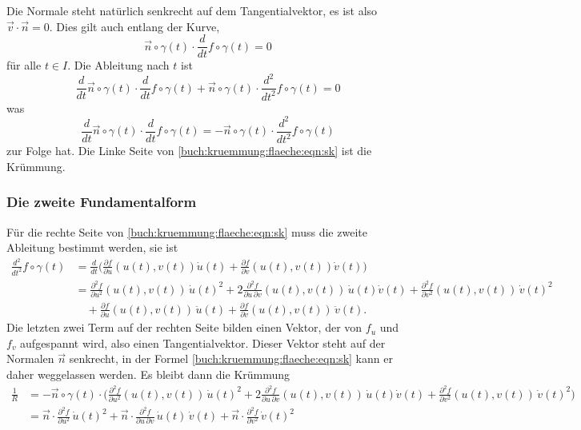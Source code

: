 Die Normale steht natürlich senkrecht auf dem Tangentialvektor, 
es ist also $\vec{v}\cdot\vec{n}=0$.
Dies gilt auch entlang der Kurve, 
\[
\vec{n}\circ\gamma(t) \cdot \frac{d}{dt}f\circ\gamma(t)
=
0
\]
für alle $t\in I$.
Die Ableitung nach $t$ ist
\[
\frac{d}{dt}
\vec{n}\circ\gamma(t)
\cdot
\frac{d}{dt}f\circ\gamma(t)
+
\vec{n}\circ\gamma(t)
\cdot
\frac{d^2}{dt^2}f\circ\gamma(t)
=
0
\]
was
\begin{equation}
\frac{d}{dt}\vec{n}\circ\gamma(t)\cdot \frac{d}{dt}f\circ\gamma(t)
=
-
\vec{n}\circ\gamma(t)
\cdot
\frac{d^2}{dt^2}f\circ\gamma(t)
\label{buch:kruemmung:flaeche:eqn:sk}
\end{equation}
zur Folge hat.
Die Linke Seite von \eqref{buch:kruemmung:flaeche:eqn:sk}
ist die Krümmung.

%
%
\subsubsection{Die zweite Fundamentalform}
Für die rechte Seite von \eqref{buch:kruemmung:flaeche:eqn:sk}
muss die zweite Ableitung bestimmt werden, sie ist
\begin{align*}
\frac{d^2}{dt^2}
f\circ\gamma(t)
&=
\frac{d}{dt}
\biggl(
\frac{\partial f}{\partial u}(u(t),v(t)) \dot{u}(t)
+
\frac{\partial f}{\partial v}(u(t),v(t)) \dot{v}(t)
\biggr)
\\
&=
\frac{\partial^2 f}{\partial u^2}(u(t),v(t)) \, \dot{u}(t)^2
+
2\frac{\partial^2 f}{\partial u\,\partial v}(u(t),v(t)) \, \dot{u}(t) \dot{v}(t)
+
\frac{\partial^2 f}{\partial v^2}(u(t),v(t)) \, \dot{v}(t)^2
\\
&\quad
+
\frac{\partial f}{\partial u}(u(t),v(t)) \, \ddot{u}(t)
+
\frac{\partial f}{\partial v}(u(t),v(t)) \, \ddot{v}(t).
\end{align*}
Die letzten zwei Term auf der rechten Seite bilden einen Vektor, der von $f_u$
und $f_v$ aufgespannt wird, also einen Tangentialvektor.
Dieser Vektor steht auf der Normalen $\vec{n}$ senkrecht, in der
Formel \eqref{buch:kruemmung:flaeche:eqn:sk} kann er daher weggelassen
werden.
Es bleibt dann die Krümmung
\begin{align*}
\frac{1}{R}
&=
-\vec{n}\circ\gamma(t)
\cdot 
\biggl(
\frac{\partial^2 f}{\partial u^2}(u(t),v(t)) \, \dot{u}(t)^2
+
2\frac{\partial^2 f}{\partial u\,\partial v}(u(t),v(t)) \, \dot{u}(t) \dot{v}(t)
+
\frac{\partial^2 f}{\partial v^2}(u(t),v(t)) \, \dot{v}(t)^2
\biggr)
\\
&=
\vec{n}\cdot\frac{\partial^2 f}{\partial u^2} \,
\dot{u}(t)^2
+
\vec{n}\cdot\frac{\partial^2 f}{\partial u\,\partial v} \,
\dot{u}(t)\,\dot{v}(t)
+
\vec{n}\cdot\frac{\partial^2 f}{\partial v^2} \,
\dot{v}(t)^2
\end{align*}
